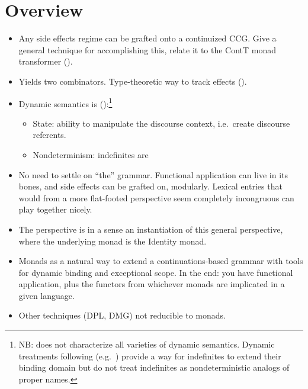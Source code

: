 \section{Overview}
\begin{itemize}	
	\item Any side effects regime can be grafted onto a continuized CCG. Give a general technique for accomplishing this, relate it to the ContT monad transformer (\citealt{Liangetal}).%
	
	\item Yields two combinators. Type-theoretic way to track effects (\citealt{Shan:2005}).%
	
	\item Dynamic semantics is (\citealt{Shan:2001}):\footnote{NB: does not characterize all varieties of dynamic semantics. Dynamic treatments following \citealt{GroenendijkStokhof:1990} (e.g.~\citealt{Zimmermann:1991, Dekker:1993, Szabolcsi:2003, Groote:2006}) provide a way for indefinites to extend their binding domain but do not treat indefinites as nondeterministic analogs of proper names.}%
	\begin{itemize}
		\item State: ability to manipulate the discourse context, i.e.~create discourse referents.%
		\item Nondeterminism: indefinites are 
	\end{itemize}
	
	\item No need to settle on ``the'' grammar. Functional application can live in its bones, and side effects can be grafted on, modularly. Lexical entries that would from a more flat-footed perspective seem completely incongruous can play together nicely. %
	
	\item The perspective \citealt{Barker:2002, ShanBarker:2006, BarkerShan:2014} is in a sense an instantiation of this general perspective, where the underlying monad is the \textsf{Identity} monad.%
	
	\item Monads as a natural way to extend a continuations-based grammar with tools for dynamic binding and exceptional scope. In the end: you have functional application, plus the functors from whichever monads are implicated in a given language. %
	
	\item Other techniques (DPL, DMG) not reducible to monads.
\end{itemize}

